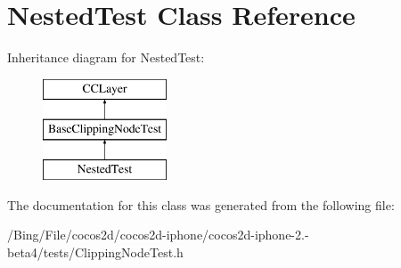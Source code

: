 \hypertarget{interface_nested_test}{\section{Nested\-Test Class Reference}
\label{interface_nested_test}
}
Inheritance diagram for Nested\-Test\-:\begin{figure}[H]
\begin{center}
\leavevmode
\includegraphics[height=3.000000cm]{interface_nested_test}
\end{center}
\end{figure}


The documentation for this class was generated from the following file\-:\begin{DoxyCompactItemize}
\item 
/\-Bing/\-File/cocos2d/cocos2d-\/iphone/cocos2d-\/iphone-\/2.-\/beta4/tests/Clipping\-Node\-Test.\-h\end{DoxyCompactItemize}
